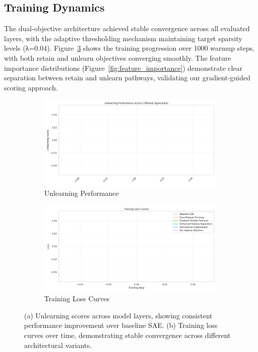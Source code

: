 \documentclass{article} %
\begin{document}
\subsection{Training Dynamics}
The dual-objective architecture achieved stable convergence across all evaluated layers, with the adaptive thresholding mechanism maintaining target sparsity levels (λ=0.04). Figure~\ref{fig:training_dynamics} shows the training progression over 1000 warmup steps, with both retain and unlearn objectives converging smoothly. The feature importance distributions (Figure~\ref{fig:feature_importance}) demonstrate clear separation between retain and unlearn pathways, validating our gradient-guided scoring approach.

\begin{figure}[h]
    \centering
    \begin{subfigure}{0.49\textwidth}
        \includegraphics[width=\textwidth]{unlearning_scores.png}
        \caption{Unlearning Performance}
        \label{fig:unlearning}
    \end{subfigure}
    \hfill
    \begin{subfigure}{0.49\textwidth}
        \includegraphics[width=\textwidth]{training_losses.png}
        \caption{Training Loss Curves}
        \label{fig:losses}
    \end{subfigure}
    \caption{(a) Unlearning scores across model layers, showing consistent performance improvement over baseline SAE. (b) Training loss curves over time, demonstrating stable convergence across different architectural variants.}
    \label{fig:training_dynamics}
\end{figure}
\end{document}
